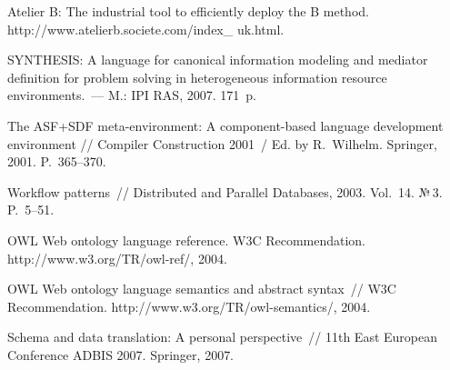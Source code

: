 \begin{multicols}{2}
{{\begin{thebibliography}{99}
Atelier B: The industrial tool to efficiently deploy the B method.
{\sf http://www.atelierb.societe.com/index\_ uk.html}.





SYNTHESIS: A language for canonical information modeling and mediator
definition for problem solving in heterogeneous information resource
environments.~---
M.: IPI RAS, 2007. 171~p.

The ASF\;+\;SDF meta-environment: A component-based language development
environment // Compiler Construction 2001~/ Ed. by R.~Wilhelm.
Springer, 2001. P.~365--370.

Workflow patterns~//
Distributed and Parallel Databases, 2003. Vol.~14. №\,3. P.~5--51.

OWL Web ontology language reference.
W3C Recommendation. {\sf http://www.w3.org/TR/owl-ref/}, 2004.

OWL Web ontology language semantics and abstract syntax~//
W3C Recommendation.
{\sf http://www.w3.org/TR/owl-semantics/}, 2004.



Schema and data translation: A personal perspective~//
11th East European Conference ADBIS 2007.
Springer, 2007.


\end{thebibliography}}}
\end{multicols}
